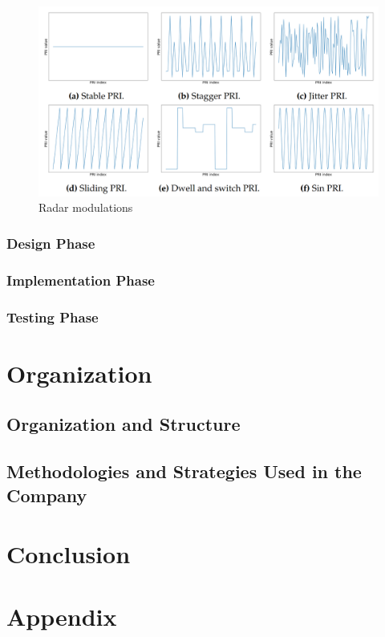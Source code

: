 \documentclass[12pt]{report}
\begin{document}
            \begin{figure}[h]
                \includegraphics[scale=0.275]{pri-modulations}
                \centering
                \caption{Radar modulations}
            \end{figure}

            

        \subsection{Design Phase}

        \subsection{Implementation Phase}

        \subsection{Testing Phase}

\chapter{Organization}

    \section{Organization and Structure}

    \section{Methodologies and Strategies Used in the Company}

\chapter{Conclusion}

\chapter{Appendix}
\end{document}
